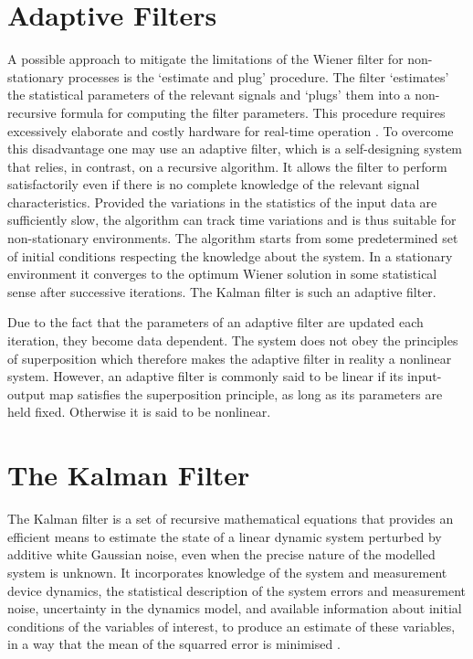 \section{Adaptive Filters}

A possible approach to mitigate the limitations of the Wiener filter for non-stationary processes is the `estimate and plug' procedure. The filter `estimates' the statistical parameters of the relevant signals and `plugs' them into a non-recursive formula for computing the filter parameters. This procedure requires excessively elaborate and costly hardware for real-time operation \cite{haykin2002adaptive}. To overcome this disadvantage one may use an adaptive filter, which is a self-designing system that relies, in contrast, on a recursive algorithm. It allows the filter to perform satisfactorily even if there is no complete knowledge of the relevant signal characteristics. Provided the variations in the  statistics of the input data are sufficiently slow, the algorithm can track time variations and is thus suitable for non-stationary environments. The algorithm starts from some predetermined set of initial conditions respecting the knowledge about the system. In a stationary environment it converges to the optimum Wiener solution in some statistical sense after successive iterations. The Kalman filter is such an adaptive filter.

Due to the fact that the parameters of an adaptive filter are updated each iteration, they become data dependent. The system does not obey the principles of superposition which therefore makes the adaptive filter in reality a nonlinear system. However, an adaptive filter is commonly said to be linear if its input-output map satisfies the superposition principle, as long as its parameters are held fixed. Otherwise it is said to be nonlinear.


\section{The Kalman Filter}

The Kalman filter is a set of recursive mathematical equations that provides an efficient means to estimate the state of a linear dynamic system perturbed by additive white Gaussian noise, even when the precise nature of the modelled system is unknown. It incorporates knowledge of the system and measurement device dynamics, the statistical description of the system errors and measurement noise, uncertainty in the dynamics model, and available information about initial conditions of the variables of interest, to produce an estimate of these variables, in a way that the mean of the squarred error is minimised \cite{Maybeck79}. 

